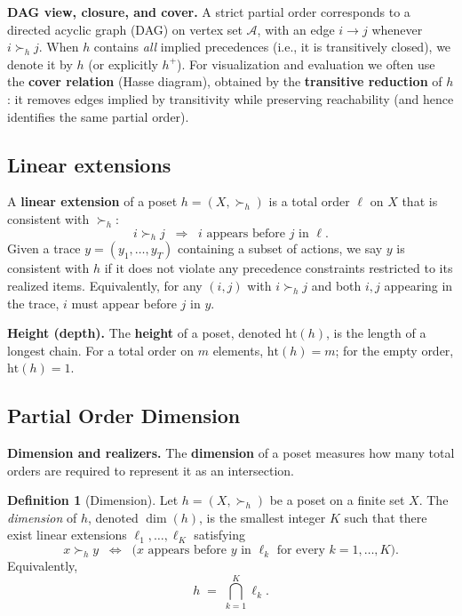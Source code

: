 \documentclass{article}
\theoremstyle{plain}
\theoremstyle{definition}
\newtheorem{definition}[theorem]{Definition}
\theoremstyle{remark}
\begin{document}
\noindent \textbf{DAG view, closure, and cover.}
A strict partial order corresponds to a directed acyclic graph (DAG) on vertex set $\mathcal{A}$,
with an edge $i\!\to\! j$ whenever $i \succ_h j$. When $h$ contains \emph{all} implied
precedences (i.e., it is transitively closed), we denote it by $h$ (or explicitly $h^+$).
For visualization and evaluation we often use the \textbf{cover relation} (Hasse diagram),
obtained by the \textbf{transitive reduction} of $h$: it removes edges implied by transitivity while
preserving reachability (and hence identifies the same partial order).

\subsection{Linear extensions}
A \textbf{linear extension} of a poset $h=(X,\succ_h)$ is a total order $\ell$ on $X$
that is consistent with $\succ_h$:
\[
i \succ_h j \;\;\Rightarrow\;\; i \text{ appears before } j \text{ in } \ell.
\]
Given a trace $y=(y_1,\dots,y_T)$ containing a subset of actions, we say $y$ is consistent
with $h$ if it does not violate any precedence constraints restricted to its realized items.
Equivalently, for any $(i,j)$ with $i\succ_h j$ and both $i,j$ appearing in the trace,
$i$ must appear before $j$ in $y$.

\noindent \textbf{Height (depth).}
The \textbf{height} of a poset, denoted $\mathrm{ht}(h)$, is the length of a longest chain.
For a total order on $m$ elements, $\mathrm{ht}(h)=m$; for the empty order, $\mathrm{ht}(h)=1$.



\subsection{Partial Order Dimension}
\label{appendix:po_dim}

\noindent \textbf{Dimension and realizers.}
The \textbf{dimension} of a poset measures how many total orders are required to represent it
as an intersection.

\begin{definition}[Dimension]
Let $h=(X,\succ_h)$ be a poset on a finite set $X$.
The \emph{dimension} of $h$, denoted $\dim(h)$, is the smallest integer $K$ such that there exist
linear extensions $\ell_1,\dots,\ell_K$ satisfying
\[
x \succ_h y
\;\;\Longleftrightarrow\;\;
\bigl(x \text{ appears before } y \text{ in } \ell_k \text{ for every } k=1,\dots,K \bigr).
\]
Equivalently,
\[
h \;=\; \bigcap_{k=1}^{K} \ell_k.
\]
\end{definition}
\end{document}

